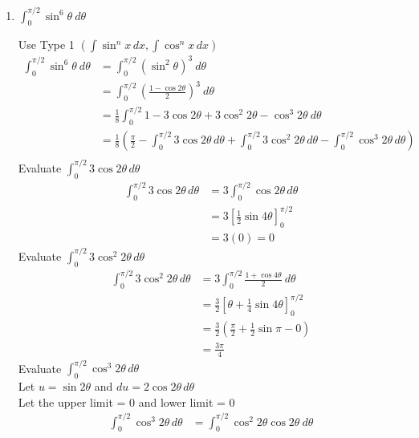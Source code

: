 \documentclass[12pt]{article}
\begin{document}
\begin{enumerate}
\item $\displaystyle\int_0^{\pi/2} \sin ^6 \theta \ d\theta$

Use Type 1 $\left(\int \sin ^n x\,dx, \int \cos ^ n x\,dx\right)$
\begin{equation*}
  \begin{aligned}
  \int_0^{\pi/2} \sin ^6 \theta \ d\theta &= \int_0^{\pi/2} (\sin ^2 \theta)^3 \ d\theta \\
  &= \int_0^{\pi/2} \left(\frac{1-\cos 2\theta}{2}\right)^3 \ d\theta \\
  &= \frac{1}{8} \int_0^{\pi/2} 1-3\cos2\theta + 3\cos^{2}2\theta -\cos^{3}2\theta \ d\theta \\
  &= \frac{1}{8} \left(\frac{\pi}{2}-\int_0^{\pi/2}3\cos2\theta\, d\theta + \int_0^{\pi/2}3\cos^{2}2\theta\,d\theta - \int_0^{\pi/2}\cos^{3}2\theta\,d\theta \right)\\
  \end{aligned}
\end{equation*}
Evaluate $\displaystyle\int_0^{\pi/2}3\cos2\theta\,d\theta$
\begin{equation*}
  \begin{aligned}
  \int_0^{\pi/2}3\cos2\theta\,d\theta &= 3\int_0^{\pi/2}\cos2\theta\, d\theta \\
  &= 3\left[\frac{1}{2}\sin4\theta\right]_0^{\pi/2}\\
  &= 3(0) = 0
  \end{aligned}
\end{equation*}
Evaluate $\displaystyle\int_0^{\pi/2}3\cos^{2}2\theta\,d\theta$
\begin{equation*}
  \begin{aligned}
  \int_0^{\pi/2}3\cos^{2}2\theta\,d\theta &= 3\int_0^{\pi/2}\frac{1+\cos4\theta}{2}\ d\theta \\
  &= \frac{3}{2}\left[\theta+\frac{1}{4}\sin4\theta\right]_0^{\pi/2}\\
  &= \frac{3}{2} \left(\frac{\pi}{2}+\frac{1}{2}\sin\pi - 0\right)\\
  &= \frac{3\pi}{4}
  \end{aligned}
\end{equation*}
Evaluate $\displaystyle\int_0^{\pi/2}\cos^{3}2\theta\,d\theta$ \\
Let $u=\sin2\theta$ and $\displaystyle du=2\cos2\theta\,d\theta$ \\
Let the upper limit = 0 and lower limit = 0
\begin{equation*}
  \begin{aligned}
  \int_0^{\pi/2}\cos^{3}2\theta\,d\theta &= \int_0^{\pi/2}\cos^{2}2\theta\cos2\theta\ d\theta \\

\end{aligned}
\end{equation*}
\end{enumerate}
\end{document}
